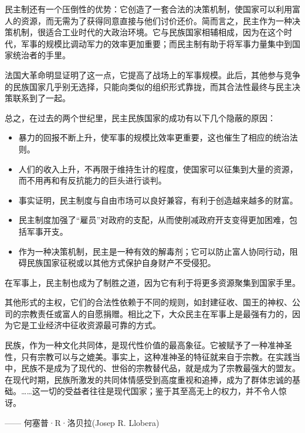 民主制还有一个压倒性的优势：它创造了一套合法的决策机制，使国家可以利用富人的资源，而无需为了获得同意直接与他们讨价还价。简而言之，民主作为一种决策机制，很适合工业时代的大政治环境。它与民族国家相辅相成，因为在这个时代，军事的规模比调动军力的效率更加重要；而民主制有助于将军事力量集中到国家统治者的手里。

法国大革命明显证明了这一点，它提高了战场上的军事规模。此后，其他参与竞争的民族国家几乎别无选择，只能向类似的组织形式靠拢，而其合法性最终与民主决策联系到了一起。

总之，在过去的两个世纪里，民主民族国家的成功有以下几个隐蔽的原因：

\begin{itemize}
    \item 暴力的回报不断上升，使军事的规模比效率更重要，这也催生了相应的统治法则。
    \item 人们的收入上升，不再限于维持生计的程度，使国家可以征集到大量的资源，而不用再和有反抗能力的巨头进行谈判。
    \item 事实证明，民主制度与自由市场可以良好兼容，有利于创造越来越多的财富。
    \item 民主制度加强了“雇员”对政府的支配，从而使削减政府开支变得更加困难，包括军事开支。
    \item 作为一种决策机制，民主是一种有效的解毒剂；它可以防止富人协同行动，阻碍民族国家征税或以其他方式保护自身财产不受侵犯。
\end{itemize}

在军事上，民主制也成为了制胜之道，因为它有利于将更多资源聚集到国家手里。

其他形式的主权，它们的合法性依赖于不同的规则，如封建征收、国王的神权、公司的宗教责任或富人的自愿捐赠。相比之下，大众民主在军事上是最强有力的，因为它是工业经济中征收资源最可靠的方式。

\begin{tcolorbox}
\kaishu 民族，作为一种文化共同体，是现代性价值的最高象征。它被赋予了一种准神圣性，只有宗教可以与之媲美。事实上，这种准神圣的特征就来自于宗教。在实践当中，民族不是成为了现代的、世俗的宗教替代品，就是成为了宗教最强大的盟友。在现代时期，民族所激发的共同体情感受到高度重视和追捧，成为了群体忠诚的基础。……这一切的受益者往往是现代国家；鉴于其至高无上的权力，并不令人惊讶。
\begin{flushright}
—— 何塞普·R·洛贝拉(Josep R. Llobera) 
\end{flushright}
\end{tcolorbox}

